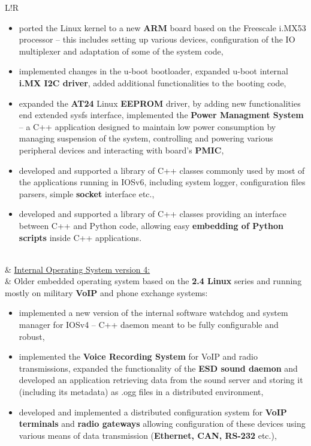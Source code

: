 \documentclass[10pt]{article}
\newcommand\VRule{\color{lightgray}\vrule width 0.5pt}
\begin{document}
\begin{longtable}{L!{\VRule}R}
\begin{itemize}
	\item ported the Linux kernel to a new \textbf{ARM} board based on the
	Freescale i.MX53 processor – this includes setting up various
	devices, configuration of the IO multiplexer and adaptation of
	some of the system code,
	\item implemented changes in the u-boot bootloader, expanded
	u-boot internal \textbf{i.MX I2C driver}, added additional functionalities
	to the booting code,
	\item expanded the \textbf{AT24} Linux \textbf{EEPROM} driver, by adding new
	functionalities end extended sysfs interface, implemented
	the \textbf{Power Managment System} – a C++ application designed to maintain
	low power consumption by managing suspension of the system,
	controlling and powering various peripheral devices and interacting
	with board's \textbf{PMIC},
	\item developed and supported a library of C++ classes commonly
	used by most of the applications running in IOSv6, including
	system logger, configuration files parsers, simple \textbf{socket}
	interface etc.,
	\item developed and supported a library of C++ classes providing an
	interface between C++ and Python code, allowing easy
	\textbf{embedding of Python scripts} inside C++ applications.
\end{itemize}
\\&
\underline{Internal Operating System version 4:}\\&
Older embedded operating system based on the \textbf{2.4 Linux} series and
running mostly on military \textbf{VoIP} and phone exchange systems:
\begin{itemize}
	\item implemented a new version of the internal software watchdog
	and system manager for IOSv4 – C++ daemon meant to be fully
	configurable and robust,
	\item implemented the \textbf{Voice Recording System} for VoIP and radio
	transmissions, expanded the functionality of the \textbf{ESD sound
	daemon} and developed an application retrieving data from the
	sound server and storing it (including its metadata) as .ogg files
	in a distributed environment,
	\item developed and implemented a distributed configuration system
	for \textbf{VoIP terminals} and \textbf{radio gateways} allowing configuration of these
	devices using various means of data transmission (\textbf{Ethernet, CAN, RS-232} etc.),

\end{itemize}
\end{longtable}
\end{document}
